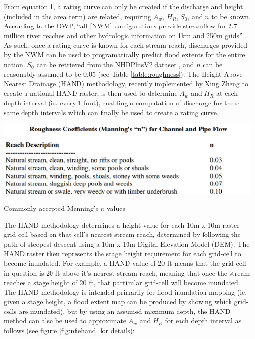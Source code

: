 \documentclass[11pt]{article}
\begin{document}
From equation 1, a rating curve can only be created if the discharge and height (included in the area term) are related, requiring $A_w$, $H_R$, $S_0$, and $n$ to be known. According to the OWP, ``all [NWM] configurations provide streamflow for 2.7 million river reaches and other hydrologic information on 1km and 250m grids'' \cite{nwmsummary}. As such, once a rating curve is known for each stream reach, discharges provided by the NWM can be used to programatically predict flood extents for the entire nation. $S_0$ can be retrieved from the NHDPlusV2 dataset \cite{nhdplusv2}, and $n$ can be reasonably assumed to be 0.05 (see Table \ref{table:roughness}). The Height Above Nearest Drainage (HAND) methodology, recently implemented by Xing Zheng to create a national HAND raster, is then used to determine $A_w$ and $H_R$ at each depth interval (ie. every 1 foot), enabling a computation of discharge for these same depth intervals which can finally be used to create a rating curve. 

\begin{table}[h]
\centering
\includegraphics[keepaspectratio, width=.8\textwidth]{n_vals.png}
\caption{Commonly accepted Manning's $n$ values \cite{roughnesstable}}\label{table:roughness}
\end{table}

The HAND methodology determines a height value for each 10m x 10m raster grid-cell based on that cell's nearest stream reach, determined by following the path of steepest descent using a 10m x 10m Digital Elevation Model (DEM). The HAND raster then represents the stage height requirement for each grid-cell to become inundated. For example, a HAND value of 20 ft means that the grid-cell in question is 20 ft above it's nearest stream reach, meaning that once the stream reaches a stage height of 20 ft, that particular grid-cell will become inundated. The HAND methodology is intended primarily for flood inundation mapping (ie. given a stage height, a flood extent map can be produced by showing which grid-cells are inundated), but by using an assumed maximum depth, the HAND method can also be used to approximate $A_w$ and $H_R$ for each depth interval as follows (see figure \ref{fig:nfiehand} for details): 
\end{document}
